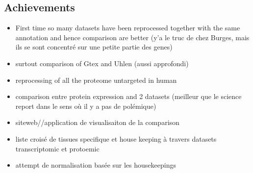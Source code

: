 \subsection*{Achievements}
\begin{itemize}
    \item First time so many datasets have been reprocessed together with the
        same annotation and hence comparison are better (y'a le truc de chez Burges,
        mais ils se sont concentré sur une petite partie des genes)
    \item surtout comparison of Gtex and Uhlen (aussi approfondi)
    \item reprocessing of all the proteome untargeted in human
    \item comparison entre protein expression and 2 datasets (meilleur que le
        science report dans le sens où il y a pas de polémique)
    \item siteweb//application de visualisaiton de la comparison
    \item liste croisé de tissues specifique et house keeping à travers datasets
       transcriptomic et protoemic
  \item attempt de normalisation basée sur les housekeepings
\end{itemize}


